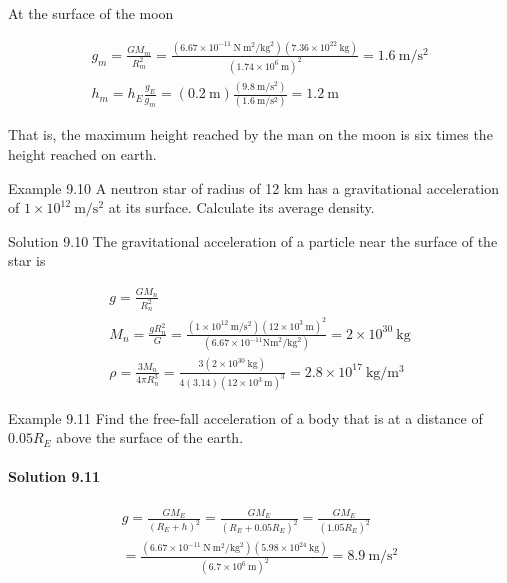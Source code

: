 \documentclass[10pt]{article}
\numberwithin{equation}{section}
\begin{document}
At the surface of the moon

$$
\begin{gathered}
g_{m}=\frac{G M_{m}}{R_{m}^{2}}=\frac{\left(6.67 \times 10^{-11} \mathrm{~N} \mathrm{~m}^{2} / \mathrm{kg}^{2}\right)\left(7.36 \times 10^{22} \mathrm{~kg}\right)}{\left(1.74 \times 10^{6} \mathrm{~m}\right)^{2}}=1.6 \mathrm{~m} / \mathrm{s}^{2} \\
h_{m}=h_{E} \frac{g_{E}}{g_{m}}=(0.2 \mathrm{~m}) \frac{\left(9.8 \mathrm{~m} / \mathrm{s}^{2}\right)}{\left(1.6 \mathrm{~m} / \mathrm{s}^{2}\right)}=1.2 \mathrm{~m}
\end{gathered}
$$

That is, the maximum height reached by the man on the moon is six times the height reached on earth.

Example 9.10 A neutron star of radius of 12 km has a gravitational acceleration of $1 \times 10^{12} \mathrm{~m} / \mathrm{s}^{2}$ at its surface. Calculate its average density.

Solution 9.10 The gravitational acceleration of a particle near the surface of the star is

$$
\begin{gathered}
g=\frac{G M_{n}}{R_{n}^{2}} \\
M_{n}=\frac{g R_{n}^{2}}{G}=\frac{\left(1 \times 10^{12} \mathrm{~m} / \mathrm{s}^{2}\right)\left(12 \times 10^{3} \mathrm{~m}\right)^{2}}{\left(6.67 \times 10^{-11} \mathrm{Nm}^{2} / \mathrm{kg}^{2}\right)}=2 \times 10^{30} \mathrm{~kg} \\
\rho=\frac{3 M_{n}}{4 \pi R_{n}^{3}}=\frac{3\left(2 \times 10^{30} \mathrm{~kg}\right)}{4(3.14)\left(12 \times 10^{3} \mathrm{~m}\right)^{3}}=2.8 \times 10^{17} \mathrm{~kg} / \mathrm{m}^{3}
\end{gathered}
$$

Example 9.11 Find the free-fall acceleration of a body that is at a distance of $0.05 R_{E}$ above the surface of the earth.

\paragraph*{Solution 9.11}
$$
\begin{gathered}
g=\frac{G M_{E}}{\left(R_{E}+h\right)^{2}}=\frac{G M_{E}}{\left(R_{E}+0.05 R_{E}\right)^{2}}=\frac{G M_{E}}{\left(1.05 R_{E}\right)^{2}} \\
=\frac{\left(6.67 \times 10^{-11} \mathrm{~N} \mathrm{~m}^{2} / \mathrm{kg}^{2}\right)\left(5.98 \times 10^{24} \mathrm{~kg}\right)}{\left(6.7 \times 10^{6} \mathrm{~m}\right)^{2}}=8.9 \mathrm{~m} / \mathrm{s}^{2}
\end{gathered}
$$
\end{document}
